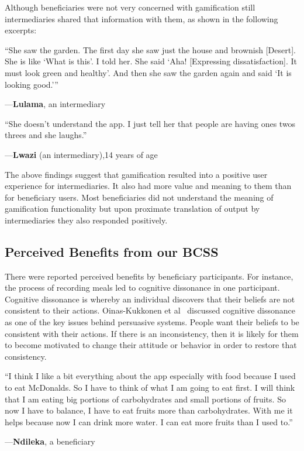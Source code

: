 \documentclass{sig-alternate}
\newenvironment{myquote}
               {\list{}{\rightmargin   \leftmargin
                        \parsep        0in }%
                \item\relax}
               {\endlist}
\newcommand{\userquote}[2]{\begin{samepage}\begin{myquote} 
     \em{\small{#2\begin{flushright}---#1\end{flushright}}}
   \end{myquote}\end{samepage}}
\begin{document}
Although beneficiaries were not very concerned with gamification still 
intermediaries shared that information with them, as shown in the 
following excerpts: 

\userquote{\textbf{Lulama}, an intermediary} {``She saw the garden. The
first day she saw just the house and brownish [Desert]. She
is like `What is this'. I told her. She said `Aha! [Expressing
dissatisfaction]. It must look green and healthy'. And then
she saw the garden again and said `It is looking good.'''}

\userquote{\textbf{Lwazi} (an intermediary),14 years of age} {``She doesn't understand the 
app. I just tell her that people are having ones twos threes and she laughs.''}

The above findings suggest that gamification resulted into a positive user 
experience for intermediaries. It also had more value and meaning to them 
than for beneficiary users. Most beneficiaries did not understand the meaning 
of gamification functionality but upon proximate translation of output by 
intermediaries they also responded positively.

\subsection{Perceived Benefits from our BCSS}

There were reported perceived benefits by beneficiary participants. For instance, the
process of recording meals led to cognitive dissonance in one participant.
Cognitive dissonance is whereby an individual discovers that their beliefs
are not consistent to their actions. Oinas-Kukkonen et 
al~\cite{Oinas-kukkonen:psd} discussed cognitive dissonance as 
one of the key issues behind persuasive systems. People want their beliefs 
to be consistent with their actions. If there is an inconsistency, then it 
is likely  for them to become motivated to change their attitude or behavior 
in order to restore that consistency.  

\userquote{\textbf{Ndileka}, a beneficiary}
{``I think I like a bit everything about the app 
especially with food because I used to eat McDonalds. So I have to think of 
what I am going to eat first. I will think that I am eating big portions of 
carbohydrates and small portions of fruits. So now I have to balance, I 
have to eat fruits more than carbohydrates. With me it helps because now I 
can drink more water. I can eat more fruits than I used to.''}
\end{document}
